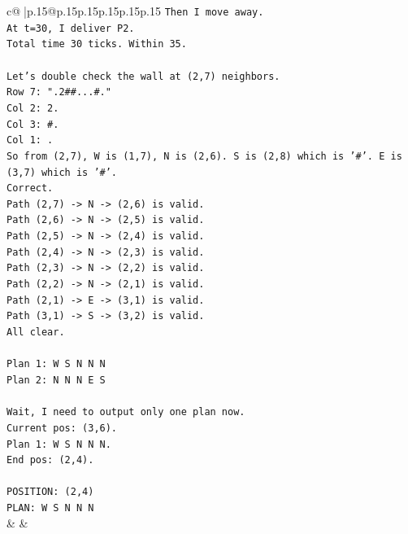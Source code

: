 \documentclass{article}
\begin{document}
{\begin{supertabular}{c@{$\;$}|p{.15\linewidth}@{}p{.15\linewidth}p{.15\linewidth}p{.15\linewidth}p{.15\linewidth}p{.15\linewidth}}
{{{\texttt{Then I move away.} \\
\texttt{At t=30, I deliver P2.} \\
\texttt{Total time 30 ticks. Within 35.} \\
\\ 
\texttt{Let's double check the wall at (2,7) neighbors.} \\
\texttt{Row 7: ".2\#\#...\#."} \\
\texttt{Col 2: 2.} \\
\texttt{Col 3: \#.} \\
\texttt{Col 1: .} \\
\texttt{So from (2,7), W is (1,7), N is (2,6). S is (2,8) which is '\#'. E is (3,7) which is '\#'.} \\
\texttt{Correct.} \\
\texttt{Path (2,7) {-}> N {-}> (2,6) is valid.} \\
\texttt{Path (2,6) {-}> N {-}> (2,5) is valid.} \\
\texttt{Path (2,5) {-}> N {-}> (2,4) is valid.} \\
\texttt{Path (2,4) {-}> N {-}> (2,3) is valid.} \\
\texttt{Path (2,3) {-}> N {-}> (2,2) is valid.} \\
\texttt{Path (2,2) {-}> N {-}> (2,1) is valid.} \\
\texttt{Path (2,1) {-}> E {-}> (3,1) is valid.} \\
\texttt{Path (3,1) {-}> S {-}> (3,2) is valid.} \\
\texttt{All clear.} \\
\\ 
\texttt{Plan 1: W S N N N} \\
\texttt{Plan 2: N N N E S} \\
\\ 
\texttt{Wait, I need to output only one plan now.} \\
\texttt{Current pos: (3,6).} \\
\texttt{Plan 1: W S N N N.} \\
\texttt{End pos: (2,4).} \\
\\ 
\texttt{POSITION: (2,4)} \\
\texttt{PLAN: W S N N N} \\
            }
        }
    }
    & & \\ \\


\end{supertabular}}
\end{document}
